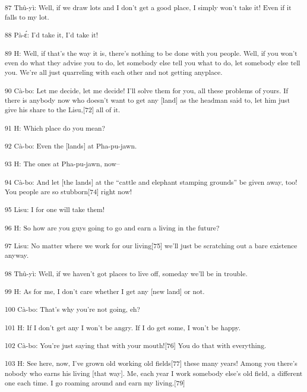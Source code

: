{\textsuperscript{87 Thû-yì: Well, if we draw lots and I don't get a good
place, I simply won't take it! Even if it falls to my lot. }}

{\textsuperscript{88 Pà-ɛ́: I'd take it, I'd take it! }}

{\textsuperscript{89 H: Well, if that's the way it is, there's nothing to
be done with you people. Well, if you won't even do what they advise you to do,
let somebody else tell you what to do, let somebody else tell you. We're all just
quarreling with each other and not getting anyplace. }}

{\textsuperscript{90 Cà-bo: Let me decide, let me decide! I'll solve them
for you, all these problems of yours. If there is anybody now who doesn't want
to get any [land] as the headman said to, let him just give his share to the Lisu,[72]
all of it. }}

{\textsuperscript{91 H: Which place do you mean? }}

{\textsuperscript{92 Cà-bo: Even the [lands] at Pha-pu-jawn.}}

{\textsuperscript{93 H: The ones at Pha-pu-jawn, now--}}

{\textsuperscript{94 Cà-bo: And let [the lands] at the ``cattle and elephant
stamping grounds'' be given away, too! You people are so stubborn[74] right now!
}}

{\textsuperscript{95 Lisu: I for one will take them!}}

{\textsuperscript{96 H: So how are you guys going to go and earn a living
in the future?}}

{\textsuperscript{97 Lisu: No matter where we work for our living[75] we'll
just be scratching out a bare existence anyway.}}

{\textsuperscript{98 Thû-yì: Well, if we haven't got places to live off,
someday we'll be in trouble.}}

{\textsuperscript{99 H: As for me, I don't care whether I get any [new land]
or not.}}

{\textsuperscript{100 Cà-bo: That's why you're not going, eh?}}

{\textsuperscript{101 H: If I don't get any I won't be angry. If I do get
some, I won't be happy.}}

{\textsuperscript{102 Cà-bo: You're just saying that with your mouth![76]
You do that with everything.}}

{\textsuperscript{103 H: See here, now, I've grown old working old fields[77]
these many years! Among you there's nobody who earns his living [that way]. Me,
each year I work somebody else's old field, a different one each time. I go roaming
around and earn my living.[79]}}

